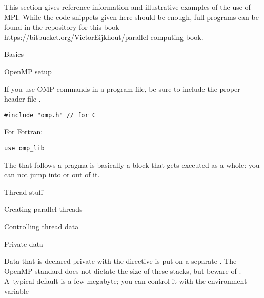 
This section gives reference information and illustrative examples
of the use of MPI. While the code snippets given here should be enough,
full programs can be found in the repository for this book
\url{https://bitbucket.org/VictorEijkhout/parallel-computing-book}.

 {Basics}

 {OpenMP setup}

If you use OMP commands in a program file, be sure to include
the proper header file .
\begin{verbatim}
#include "omp.h" // for C
\end{verbatim}

For Fortran:
\begin{verbatim}
use omp_lib
\end{verbatim}
The  that follows a pragma is basically a block 
that gets executed as a whole: you can not jump into or out of it.

 {Thread stuff}

 {Creating parallel threads}



 {Controlling thread data}


 {Private data}

Data that is declared private with the  directive is
put on a separate . The OpenMP standard
does not dictate the size of these stacks, but beware of .
A~typical default
is a few megabyte; you can control it with the environment variable


